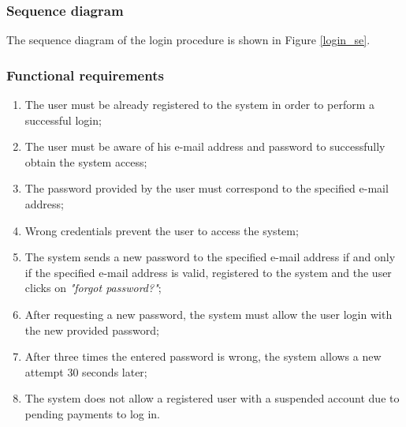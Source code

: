 \subsubsection{Sequence diagram}
The sequence diagram of the login procedure is shown in Figure \ref{login_se}.

\subsubsection{Functional requirements}
\begin{enumerate}
\item The user must be already registered to the system in order to perform a successful login;
\item The user must be aware of his e-mail address and password to successfully obtain the system access;
\item The password provided by the user must correspond to the specified e-mail address;
\item Wrong credentials prevent the user to access the system;
\item The system sends a new password to the specified e-mail address if and only if the specified e-mail address is valid, registered to the system and the user clicks on \emph{"forgot password?"};
\item After requesting a new password, the system must allow the user login with the new provided password;
\item After three times the entered password is wrong, the system allows a new attempt 30 seconds later;
\item The system does not allow a registered user with a suspended account due to pending payments to log in.
\end{enumerate}

